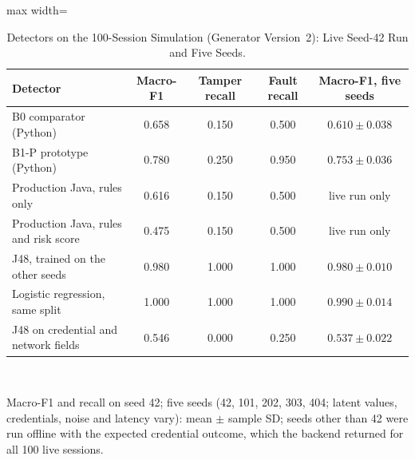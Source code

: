\documentclass[sigconf,screen]{acmart}
\begin{document}
\begin{table}[tbp]
\centering
\small
\caption{Detectors on the 100-Session Simulation (Generator Version~2): Live Seed-42 Run and Five Seeds.}
\label{tab:b0_vs_b1}
\begin{adjustbox}{max width=\textwidth}
\begin{tabular}{l c c c c}
\toprule
Detector & Macro-F1 & Tamper recall & Fault recall & Macro-F1, five seeds \\
\midrule
B0 comparator (Python) & 0.658 & 0.150 & 0.500 & $0.610\pm0.038$ \\
B1-P prototype (Python) & 0.780 & 0.250 & 0.950 & $0.753\pm0.036$ \\
Production Java, rules only & 0.616 & 0.150 & 0.500 & live run only \\
Production Java, rules and risk score & 0.475 & 0.150 & 0.500 & live run only \\
J48, trained on the other seeds & 0.980 & 1.000 & 1.000 & $0.980\pm0.010$ \\
Logistic regression, same split & 1.000 & 1.000 & 1.000 & $0.990\pm0.014$ \\
J48 on credential and network fields & 0.546 & 0.000 & 0.250 & $0.537\pm0.022$ \\
\bottomrule
\end{tabular}
\end{adjustbox}
\\[2pt]
\parbox{0.92\linewidth}{\footnotesize Macro-F1 and recall on seed 42; five seeds (42, 101, 202, 303, 404; latent values, credentials, noise and latency vary): mean $\pm$ sample SD; seeds other than 42 were run offline with the expected credential outcome, which the backend returned for all 100 live sessions.}
\end{table}
\end{document}
